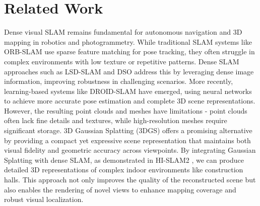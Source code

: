 \section{Related Work}
\label{RelatedWork}
Dense visual SLAM remains fundamental for autonomous navigation and 3D mapping in robotics and photogrammetry. While traditional SLAM systems like ORB-SLAM \cite{mur2015orb} use sparse feature matching for pose tracking, they often struggle in complex environments with low texture or repetitive patterns. Dense SLAM approaches such as LSD-SLAM \cite{engel2014lsd} and DSO \cite{engel2017direct} address this by leveraging dense image information, improving robustness in challenging scenarios. More recently, learning-based systems like DROID-SLAM \cite{teed2021droid} have emerged, using neural networks to achieve more accurate pose estimation and complete 3D scene representations. However, the resulting point clouds and meshes have limitations - point clouds often lack fine details and textures, while high-resolution meshes require significant storage. 3D Gaussian Splatting (3DGS) \cite{kerbl2024hierarchical} offers a promising alternative by providing a compact yet expressive scene representation that maintains both visual fidelity and geometric accuracy across viewpoints. By integrating Gaussian Splatting with dense SLAM, as demonstrated in HI-SLAM2 \cite{zhang2024hislam2}, we can produce detailed 3D representations of complex indoor environments like construction halls. This approach not only improves the quality of the reconstructed scene but also enables the rendering of novel views to enhance mapping coverage and robust visual localization.